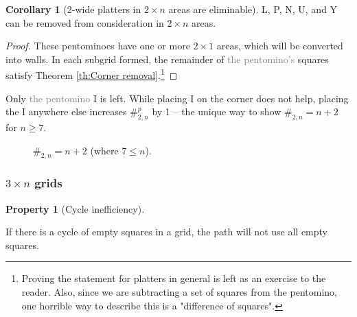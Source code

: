 \documentclass{article}
\theoremstyle{definition}%
\newtheorem{corollary}[theorem]{Corollary}%
\newtheorem{property}[theorem]{Property}
\newcommand{\minordetail}[1]{\textcolor{gray}{#1}}
\begin{document}
\begin{corollary}[2-wide platters in $2 \times n$ areas are eliminable]
\label{cor:2xn elim}
L, P, N, U, and Y can be removed from consideration in $2 \times n$ areas.
\end{corollary}

\begin{proof}
These pentominoes have one or more $2 \times 1$ areas, which will be converted into walls. In each subgrid formed, the remainder of \minordetail{the pentomino's} squares satisfy Theorem \ref{th:Corner removal}.\footnote{Proving the statement for platters in general is left as an exercise to the reader. Also, since we are subtracting a set of squares from the pentomino, one horrible way to describe this is a "difference of squares".}
\end{proof}

Only \minordetail{the pentomino} I is left. While placing I on the corner does not help, placing the I anywhere else increases $\#^p_{2, n}$ by 1 -- the unique way to show $\#_{2, n} = n + 2$ for $n \ge 7$.

\begin{figure}[!h]
    \centering
    \caption{$\#_{2, n} = n + 2$ (where $7 \le n$). \cite{sheet}}
\end{figure}

\subsubsection{\texorpdfstring{$3 \times n$}{3 \texttimes n} grids}

\begin{property}[Cycle inefficiency]
\label{prop:cycineff}

If there is a cycle of empty squares in a grid, the path will not use all empty squares.
\end{property}
\end{document}
